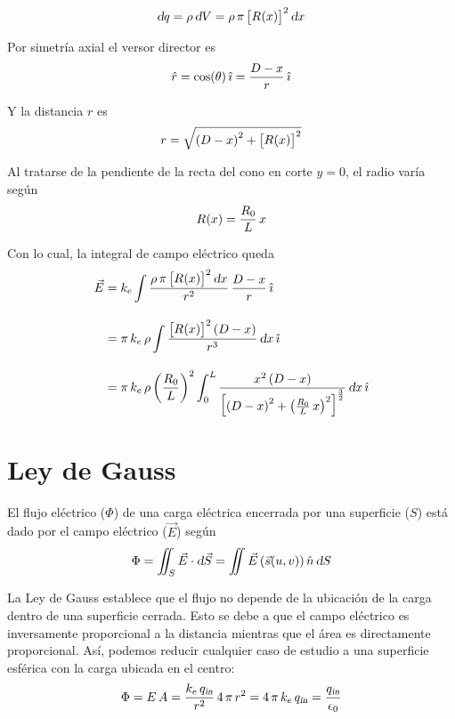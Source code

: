 \documentclass[a5paper,12pt,twoside]{book}
\begin{document}
\begin{mdframed}[style=MyFrame2]

    \begin{equation*}
        \textsl{d} q = \rho \, \textsl{d} V = \rho \, \pi \, { \begin{bmatrix} R \hspace{-0.5mm} \left( x \right) \end{bmatrix} }^2 \, \textsl{d} x
    \end{equation*}

    Por simetría axial el versor director es
    \begin{equation*}
        \hat{r} = \cos(\theta) \, \hat{\imath}
        = \frac{D-x}{r} \, \hat{\imath}
    \end{equation*}

    Y la distancia $r$ es
    \begin{equation*}
        r = \sqrt{\left(D-x\right)^2 + { \begin{bmatrix} R \hspace{-0.5mm} \left( x \right) \end{bmatrix} }^2}
    \end{equation*}

    Al tratarse de la pendiente de la recta del cono en corte $y=0$, el radio varía según
    \begin{equation*}
        R \hspace{-0.5mm} \left( x \right) = \frac{R_0}{L} \, x
    \end{equation*}

    Con lo cual, la integral de campo eléctrico queda
    \begin{align*}
        \vec{E} &= k_e \int \frac{\rho \, \pi \, { \begin{bmatrix} R \hspace{-0.5mm} \left( x \right) \end{bmatrix} }^2 \, \textsl{d} x}{r^2} \, \frac{D-x}{r} \, \hat{\imath}
        \\[1em]
        &= \pi \, k_e \, \rho \int \frac{{ \begin{bmatrix} R \hspace{-0.5mm} \left( x \right) \end{bmatrix} }^2 \left(D-x\right)}{r^3} \, \textsl{d} x \, \hat{\imath}
        \\[1em]
        &= \pi \, k_e \, \rho \left(\frac{R_0}{L}\right)^2 \int_0^L \frac{x^2 \left(D-x\right)}{{ \begin{bmatrix} \left(D-x\right)^2 + \left(\frac{R_0}{L} \, x\right)^2 \end{bmatrix} }^{\frac{3}{2}}} \, \textsl{d} x \, \hat{\imath}
    \end{align*}
\end{mdframed}


\section{Ley de Gauss}

El flujo eléctrico ($\Phi$) de una carga eléctrica encerrada por una superficie ($S$) está dado por el campo eléctrico ($\Vec{E}$) según
\begin{equation*}
    \Phi = \iint_S \Vec{E} \cdot \textsl{d} \Vec{S} = \iint \Vec{E} \left(\Vec{s}(u,v)\right) \hat{n} \, \textsl{d} S
\end{equation*}

La Ley de Gauss establece que el flujo no depende de la ubicación de la carga dentro de una superficie cerrada. Esto se debe a que el campo eléctrico es inversamente proporcional a la distancia mientras que el área es directamente proporcional.
Así, podemos reducir cualquier caso de estudio a una superficie esférica con la carga ubicada en el centro:
\begin{equation*}
    \Phi = E \, A = \frac{k_e \, {{q}_\textsl{{in}}}}{r^2} \, 4 \, \pi \, r^2 = 4 \, \pi \, k_e \, {{q}_\textsl{{in}}} = \frac{{{q}_\textsl{{in}}}}{\epsilon_0}
\end{equation*}
\end{document}

